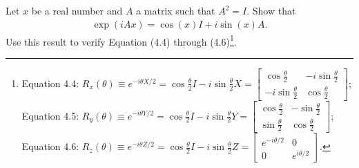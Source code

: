 \documentclass[en]{sol-man}
\begin{document}
\begin{exe}
    Let $x$ be a real number and $A$ a matrix such that $A^2=I$. Show that
    \begin{align}
        \label{E4.2}
        \exp(iAx)=\cos(x)I+i\sin(x)A.
    \end{align}
    Use this result to verify Equation (4.4) through (4.6)\footnote{Equation 4.4: $R_x(\theta)\equiv e^{-i\theta X/2}=\cos\frac{\theta}{2}I-i\sin\frac{\theta}{2}X=\left[\begin{matrix}
        \cos\frac{\theta}{2}&-i\sin\frac{\theta}{2}\\
        -i\sin\frac{\theta}{2}&\cos\frac{\theta}{2}
    \end{matrix}\right]$;\\
    Equation 4.5: $R_y(\theta)\equiv e^{-i\theta Y/2}=\cos\frac{\theta}{2}I-i\sin\frac{\theta}{2}Y=\left[\begin{matrix}
        \cos\frac{\theta}{2}&-\sin\frac{\theta}{2}\\
        \sin\frac{\theta}{2}&\cos\frac{\theta}{2}
    \end{matrix}\right]$;\\
    Equation 4.6: $R_z(\theta)\equiv e^{-i\theta Z/2}=\cos\frac{\theta}{2}I-i\sin\frac{\theta}{2}Z=\left[\begin{matrix}
        e^{-i\theta/2}&0\\
        0&e^{i\theta/2}
    \end{matrix}\right]$.}.
\end{exe}
\end{document}
